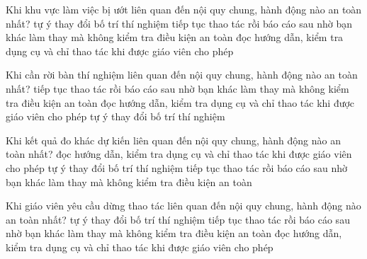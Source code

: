 \begin{ex}
Khi khu vực làm việc bị ướt liên quan đến nội quy chung, hành động nào an toàn nhất?
\choice
{tự ý thay đổi bố trí thí nghiệm}
{tiếp tục thao tác rồi báo cáo sau}
{nhờ bạn khác làm thay mà không kiểm tra điều kiện an toàn}
{\True đọc hướng dẫn, kiểm tra dụng cụ và chỉ thao tác khi được giáo viên cho phép}
\end{ex}

\begin{ex}
Khi cần rời bàn thí nghiệm liên quan đến nội quy chung, hành động nào an toàn nhất?
\choice
{tiếp tục thao tác rồi báo cáo sau}
{nhờ bạn khác làm thay mà không kiểm tra điều kiện an toàn}
{\True đọc hướng dẫn, kiểm tra dụng cụ và chỉ thao tác khi được giáo viên cho phép}
{tự ý thay đổi bố trí thí nghiệm}
\end{ex}

\begin{ex}
Khi kết quả đo khác dự kiến liên quan đến nội quy chung, hành động nào an toàn nhất?
\choice
{\True đọc hướng dẫn, kiểm tra dụng cụ và chỉ thao tác khi được giáo viên cho phép}
{tự ý thay đổi bố trí thí nghiệm}
{tiếp tục thao tác rồi báo cáo sau}
{nhờ bạn khác làm thay mà không kiểm tra điều kiện an toàn}
\end{ex}

\begin{ex}
Khi giáo viên yêu cầu dừng thao tác liên quan đến nội quy chung, hành động nào an toàn nhất?
\choice
{tự ý thay đổi bố trí thí nghiệm}
{tiếp tục thao tác rồi báo cáo sau}
{nhờ bạn khác làm thay mà không kiểm tra điều kiện an toàn}
{\True đọc hướng dẫn, kiểm tra dụng cụ và chỉ thao tác khi được giáo viên cho phép}
\end{ex}

